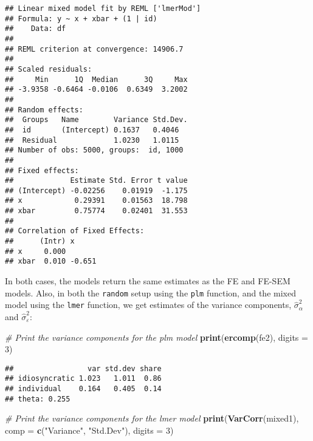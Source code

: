 \documentclass[]{interact}
\theoremstyle{plain}%
\theoremstyle{definition}
\theoremstyle{remark}
\newenvironment{Shaded}{\begin{snugshade}}{\end{snugshade}}
\newcommand{\CommentTok}[1]{\textcolor[rgb]{0.56,0.35,0.01}{\textit{#1}}}
\newcommand{\DataTypeTok}[1]{\textcolor[rgb]{0.13,0.29,0.53}{#1}}
\newcommand{\DecValTok}[1]{\textcolor[rgb]{0.00,0.00,0.81}{#1}}
\newcommand{\KeywordTok}[1]{\textcolor[rgb]{0.13,0.29,0.53}{\textbf{#1}}}
\newcommand{\NormalTok}[1]{#1}
\newcommand{\StringTok}[1]{\textcolor[rgb]{0.31,0.60,0.02}{#1}}
\begin{document}
\begin{verbatim}
## Linear mixed model fit by REML ['lmerMod']
## Formula: y ~ x + xbar + (1 | id)
##    Data: df
## 
## REML criterion at convergence: 14906.7
## 
## Scaled residuals: 
##     Min      1Q  Median      3Q     Max 
## -3.9358 -0.6464 -0.0106  0.6349  3.2002 
## 
## Random effects:
##  Groups   Name        Variance Std.Dev.
##  id       (Intercept) 0.1637   0.4046  
##  Residual             1.0230   1.0115  
## Number of obs: 5000, groups:  id, 1000
## 
## Fixed effects:
##             Estimate Std. Error t value
## (Intercept) -0.02256    0.01919  -1.175
## x            0.29391    0.01563  18.798
## xbar         0.75774    0.02401  31.553
## 
## Correlation of Fixed Effects:
##      (Intr) x     
## x     0.000       
## xbar  0.010 -0.651
\end{verbatim}

\doublespacing

In both cases, the models return the same estimates as the FE and FE-SEM
models. Also, in both the \texttt{random} setup using the \texttt{plm}
function, and the mixed model using the \texttt{lmer} function, we get
estimates of the variance components, \(\hat{\sigma}^{2}_{\alpha}\) and
\(\hat{\sigma}^{2}_{\varepsilon}\):

\singlespacing

\begin{Shaded}
\begin{Highlighting}[]
\CommentTok{# Print the variance components for the plm model  }
\KeywordTok{print}\NormalTok{(}\KeywordTok{ercomp}\NormalTok{(fe2), }
      \DataTypeTok{digits =} \DecValTok{3}\NormalTok{)}
\end{Highlighting}
\end{Shaded}

\begin{verbatim}
##                 var std.dev share
## idiosyncratic 1.023   1.011  0.86
## individual    0.164   0.405  0.14
## theta: 0.255
\end{verbatim}

\begin{Shaded}
\begin{Highlighting}[]
\CommentTok{# Print the variance components for the lmer model }
\KeywordTok{print}\NormalTok{(}\KeywordTok{VarCorr}\NormalTok{(mixed1), }
      \DataTypeTok{comp =} \KeywordTok{c}\NormalTok{(}\StringTok{"Variance"}\NormalTok{, }\StringTok{"Std.Dev"}\NormalTok{), }
      \DataTypeTok{digits =} \DecValTok{3}\NormalTok{)}
\end{Highlighting}
\end{Shaded}
\end{document}
